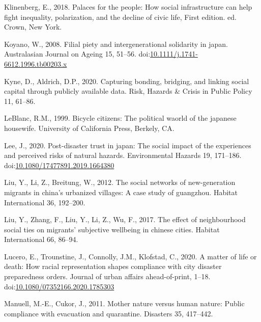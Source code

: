 \documentclass[]{elsarticle} %
\newlength{\cslhangindent}
\newlength{\cslentryspacingunit} %
\newenvironment{CSLReferences}[2] %
 {%
  \setlength{\parindent}{0pt}
  \ifodd #1
  \let\oldpar\par
  \def\par{\hangindent=\cslhangindent\oldpar}
  \fi
  \setlength{\parskip}{#2\cslentryspacingunit}
 }%
 {}
\begin{document}
\begin{CSLReferences}{1}{0}
\leavevmode{}%
Klinenberg, E., 2018. Palaces for the people: How social infrastructure
can help fight inequality, polarization, and the decline of civic life,
First edition. ed. Crown, New York.

\leavevmode{}%
Koyano, W., 2008. Filial piety and intergenerational solidarity in
japan. Australasian Journal on Ageing 15, 51--56.
doi:\href{https://doi.org/10.1111/j.1741-6612.1996.tb00203.x}{10.1111/j.1741-6612.1996.tb00203.x}

\leavevmode{}%
Kyne, D., Aldrich, D.P., 2020. Capturing bonding, bridging, and linking
social capital through publicly available data. Risk, Hazards \& Crisis
in Public Policy 11, 61--86.

\leavevmode{}%
LeBlanc, R.M., 1999. Bicycle citizens: The political waorld of the
japanese housewife. University of California Press, Berkely, CA.

\leavevmode{}%
Lee, J., 2020. Post-disaster trust in japan: The social impact of the
experiences and perceived risks of natural hazards. Environmental
Hazards 19, 171--186.
doi:\href{https://doi.org/10.1080/17477891.2019.1664380}{10.1080/17477891.2019.1664380}

\leavevmode{}%
Liu, Y., Li, Z., Breitung, W., 2012. The social networks of
new-generation migrants in china's urbanized villages: A case study of
guangzhou. Habitat International 36, 192--200.

\leavevmode{}%
Liu, Y., Zhang, F., Liu, Y., Li, Z., Wu, F., 2017. The effect of
neighbourhood social ties on migrants' subjective wellbeing in chinese
cities. Habitat International 66, 86--94.

\leavevmode{}%
Lucero, E., Trounstine, J., Connolly, J.M., Klofstad, C., 2020. A matter
of life or death: How racial representation shapes compliance with city
disaster preparedness orders. Journal of urban affairs ahead-of-print,
1--18.
doi:\href{https://doi.org/10.1080/07352166.2020.1785303}{10.1080/07352166.2020.1785303}

\leavevmode{}%
Manuell, M.-E., Cukor, J., 2011. Mother nature versus human nature:
Public compliance with evacuation and quarantine. Disasters 35,
417--442.


\end{CSLReferences}
\end{document}
